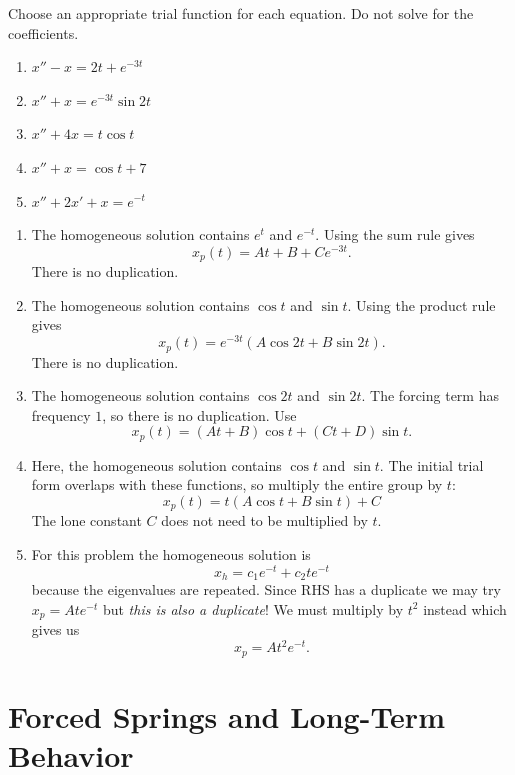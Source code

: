 \documentclass[10pt,letterpaper]{article}
\begin{document}
\begin{example}[3]{
Choose an appropriate trial function for each equation.
Do not solve for the coefficients.
\begin{enumerate}
    \item $x''-x=2t+e^{-3t}$
    \item $x''+x=e^{-3t}\sin 2t$
    \item $x''+4x=t\cos t$
    \item $x''+x=\cos t+7$
    \item $x''+2x'+x=e^{-t}$
\end{enumerate}
}

\begin{enumerate}
    \item The homogeneous solution contains $e^t$ and $e^{-t}$.
    Using the sum rule gives
    \[
    x_p(t)=At+B+Ce^{-3t}.
    \]
    There is no duplication.

    \item The homogeneous solution contains $\cos t$ and
    $\sin t$. Using the product rule gives
    \[
    x_p(t)=e^{-3t}(A\cos 2t+B\sin 2t).
    \]
    There is no duplication.

    \item The homogeneous solution contains $\cos 2t$ and
    $\sin 2t$. The forcing term has frequency $1$, so
    there is no duplication. Use
    \[
    x_p(t)=(At+B)\cos t+(Ct+D)\sin t.
    \]

    \item Here, the homogeneous solution contains $\cos t$
    and $\sin t$. The initial trial form overlaps with
    these functions, so multiply the entire group by $t$:
    \[
    x_p(t)=t(A\cos t+B\sin t) +C
    \]
    The lone constant $C$ does not need to be multiplied by $t$.

    \item For this problem the homogeneous solution is 
    $$
        x_h=c_1e^{-t}+c_2te^{-t}
    $$
    because the eigenvalues are repeated. Since RHS has a duplicate we may try $x_p=Ate^{-t}$ but \textit{this is also a duplicate}! We must multiply by $t^2$ instead which gives us 
    $$
        x_p = At^2e^{-t}.
    $$

\end{enumerate}
\end{example}


\section{Forced Springs and Long-Term Behavior}
\end{document}
